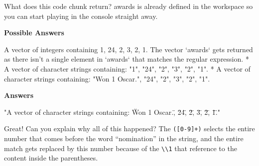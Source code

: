 \documentclass[]{article}
\newcommand{\hlnum}[1]{\textcolor[rgb]{0.816,0.125,0.439}{#1}}%
\newcommand{\hlstr}[1]{\textcolor[rgb]{0.251,0.627,0.251}{#1}}%
\newcommand{\hlstd}[1]{\textcolor[rgb]{0.251,0.251,0.251}{#1}}%
\newcommand{\hlkwc}[1]{\textcolor[rgb]{0.251,0.251,0.251}{#1}}%
\newcommand{\hlkwd}[1]{\textcolor[rgb]{0.878,0.439,0.125}{#1}}%
\newenvironment{Shaded}{\begin{myshaded}}{\end{myshaded}}
\renewenvironment{verbatim}{\color{codecolor}\begin{myshaded}\begin{oldverbatim}}{\end{oldverbatim}\end{myshaded}}
\newcommand{\KeywordTok}[1]{\hlkwd{#1}}
\newcommand{\DataTypeTok}[1]{\hlkwc{#1}}
\newcommand{\DecValTok}[1]{\hlnum{#1}}
\newcommand{\CharTok}[1]{\hlstr{#1}}
\newcommand{\StringTok}[1]{\hlstr{#1}}
\newcommand{\NormalTok}[1]{\hlstd{#1}}
\begin{document}
\begin{Shaded}
\end{Shaded}

What does this code chunk return? awards is already defined in the
workspace so you can start playing in the console straight away.

\textbf{Possible Answers}

\begin{Shaded}
\begin{Highlighting}[]
\OperatorTok{*}\StringTok{ }\NormalTok{A vector of integers containing}\OperatorTok{:}\StringTok{ }\DecValTok{1}\NormalTok{, }\DecValTok{24}\NormalTok{, }\DecValTok{2}\NormalTok{, }\DecValTok{3}\NormalTok{, }\DecValTok{2}\NormalTok{, }\DecValTok{1}\NormalTok{.}
\OperatorTok{*}\StringTok{ }\NormalTok{The vector }\StringTok{`}\DataTypeTok{awards}\StringTok{`}\NormalTok{ gets returned as there isn}\StringTok{'t a single element in `awards` that matches the regular expression.}
\StringTok{* A vector of character strings containing: "1", "24", "2", "3", "2", "1".}
\StringTok{* A vector of character strings containing: "Won 1 Oscar.", "24", "2", "3", "2", "1".}
\end{Highlighting}
\end{Shaded}

\textbf{Answers}

\begin{verbatim}
   [1] "A vector of character strings containing: \"Won 1 Oscar.\", \"24\", \"2\", \"3\", \"2\", \"1\"."
\end{verbatim}

Great! Can you explain why all of this happened? The
\texttt{({[}0-9{]}+)} selects the entire number that comes before the
word ``nomination'' in the string, and the entire match gets replaced by
this number because of the \texttt{\textbackslash{}\textbackslash{}1}
that reference to the content inside the parentheses.
\end{document}
